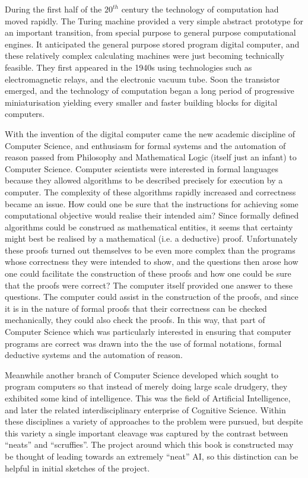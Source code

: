During the first half of the $20^{th}$ century the technology of computation had moved rapidly.
The Turing machine provided a very simple abstract prototype for an important transition, from special purpose to general purpose computational engines.
It anticipated the general purpose stored program digital computer, and these relatively complex calculating machines were just becoming technically feasible.
They first appeared in the 1940s using technologies such as electromagnetic relays, and the electronic vacuum tube.
Soon the transistor emerged, and the technology of computation began a long period of progressive miniaturisation yielding every smaller and faster building blocks for digital computers.

With the invention of the digital computer came the new academic discipline of Computer Science, and enthusiasm for formal systems and the automation of reason passed from Philosophy and Mathematical Logic (itself just an infant) to Computer Science.
Computer scientists were interested in formal languages because they allowed algorithms to be described precisely for execution by a computer.
The complexity of these algorithms rapidly increased and correctness became an issue.
How could one be sure that the instructions for achieving some computational objective would realise their intended aim?
Since formally defined algorithms could be construed as mathematical entities, it seems that certainty might best be realised by a mathematical (i.e. a deductive) proof.
Unfortunately these proofs turned out themselves to be even more complex than the programs whose correctness they were intended to show, and the questions then arose how one could facilitate the construction of these proofs and how one could be sure that the proofs were correct?
The computer itself provided one answer to these questions.
The computer could assist in the construction of the proofs, and since it is in the nature of formal proofs that their correctness can be checked mechanically, they could also check the proofs.
In this way, that part of Computer Science which was particularly interested in ensuring that computer programs are correct was drawn into the the use of formal notations, formal deductive systems and the automation of reason.

Meanwhile another branch of Computer Science developed which sought to program computers so that instead of merely doing large scale drudgery, they exhibited some kind of intelligence.
This was the field of Artificial Intelligence, and later the related interdisciplinary enterprise of Cognitive Science.
Within these disciplines a variety of approaches to the problem were pursued, but despite this variety a single important cleavage was captured by the contrast between ``neats'' and ``scruffies''.
The project around which this book is constructed may be thought of leading towards an extremely ``neat'' AI, so this distinction can be helpful in initial sketches of the project.

